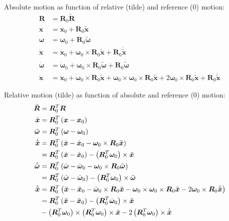 \documentclass[10pt,fleqn,subeqn]{report}
\newcommand{\T}[1]{\bm{#1}}
\newcommand{\TT}[1]{\bm{#1}}
\begin{document}
Absolute motion as function of relative (tilde) and reference (0) motion:
\begin{subequations}
\begin{align}
	\TT{R} &= \TT{R}_0 \tilde{\TT{R}} \\
	\T{x} &= \T{x}_0 + \TT{R}_0 \tilde{\T{x}} \\
	\T{\omega} &= \T{\omega}_0 + \TT{R}_0 \tilde{\T{\omega}} \\
	\dot{\T{x}} &= \dot{\T{x}}_0
		+ \T{\omega}_0 \times \TT{R}_0 \tilde{\T{x}}
		+ \TT{R}_0 \dot{\tilde{\T{x}}}
		\label{eq:relframe:xp} \\
	\dot{\T{\omega}} &= \dot{\T{\omega}}_0
		+ \T{\omega}_0 \times \TT{R}_0 \tilde{\T{\omega}}
		+ \TT{R}_0 \dot{\tilde{\T{\omega}}} \\
	\ddot{\T{x}} &= \ddot{\T{x}}_0
		+ \dot{\T{\omega}}_0 \times \TT{R}_0 \tilde{\T{x}}
		+ \T{\omega}_0 \times \T{\omega}_0 \times \TT{R}_0 \tilde{\T{x}}
		+ 2 \T{\omega}_0 \times \TT{R}_0 \dot{\tilde{\T{x}}}
		+ \TT{R}_0 \ddot{\tilde{\T{x}}}
\end{align}
\end{subequations}

Relative motion (tilde) as function of absolute and reference (0) motion:
\begin{subequations}
\begin{align}
	\tilde{\TT{R}} &= \TT{R}_0^T \TT{R} \\
	\tilde{\T{x}} &= \TT{R}_0^T\plbr{\T{x} - \T{x}_0} \\
	\tilde{\T{\omega}} &= \TT{R}_0^T\plbr{\T{\omega} - \T{\omega}_0} \\
	\dot{\tilde{\T{x}}} &= \TT{R}_0^T\plbr{
		\dot{\T{x}} - \dot{\T{x}}_0
		- \T{\omega}_0 \times \TT{R}_0 \tilde{\T{x}}
	} \nonumber \\
	&= \TT{R}_0^T\plbr{
		\dot{\T{x}} - \dot{\T{x}}_0
	} - \plbr{\TT{R}_0^T \T{\omega}_0} \times \tilde{\T{x}} \\
	\dot{\tilde{\T{\omega}}} &= \TT{R}_0^T\plbr{
		\dot{\T{\omega}}
		- \dot{\T{\omega}}_0
		- \T{\omega}_0 \times \TT{R}_0 \tilde{\T{\omega}}
	} \nonumber \\
	&= \TT{R}_0^T\plbr{
		\dot{\T{\omega}}
		- \dot{\T{\omega}}_0
	} - \plbr{\TT{R}_0^T \T{\omega}_0} \times \tilde{\T{\omega}} \\
	\ddot{\tilde{\T{x}}} &= \TT{R}_0^T\plbr{
		\ddot{\T{x}}
		- \ddot{\T{x}}_0
		- \dot{\T{\omega}}_0 \times \TT{R}_0 \tilde{\T{x}}
		- \T{\omega}_0 \times \T{\omega}_0 \times \TT{R}_0 \tilde{\T{x}}
		- 2 \T{\omega}_0 \times \TT{R}_0 \dot{\tilde{\T{x}}}
	} \nonumber \\
 	&= \TT{R}_0^T\plbr{
		\ddot{\T{x}}
		- \ddot{\T{x}}_0
	} - \plbr{\TT{R}_0^T \dot{\T{\omega}}_0} \times \tilde{\T{x}} \nonumber \\
	& \mbox{} - \plbr{\TT{R}_0^T \T{\omega}_0} \times \plbr{\TT{R}_0^T \T{\omega}_0} \times \tilde{\T{x}}
		- 2 \plbr{\TT{R}_0^T \T{\omega}_0} \times \dot{\tilde{\T{x}}}
\end{align}
\end{subequations}
\end{document}
